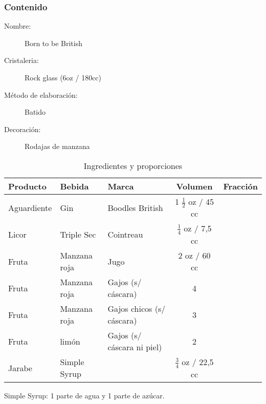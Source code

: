 \bigskip 
\bigskip 
\subsubsection{Contenido}
\bigskip 

\begin{description}
\item[Nombre:] Born to be British
\item[Cristaleria:] Rock glass (6oz / 180cc)
\item[M\'etodo de elaboraci\'on:] Batido
\item[Decoraci\'on:] Rodajas de manzana
\end{description}

\begin{table}[h]
\caption{Ingredientes y proporciones} 
\label{tab:fonts}
\begin{center}       
\begin{tabular}{|l|l|l|c|l|} %
\hline
\rule[-1ex]{0pt}{3.5ex}  \textbf{Producto} & \textbf{Bebida} & \textbf{Marca} & \textbf{Volumen} & \textbf{Fracci\'on}  \\
\hline
\rule[-1ex]{0pt}{3.5ex}  Aguardiente & Gin 			& Boodles British 		& 1  $\frac{1}{2}$ oz / 45 cc 	&  	\\
\hline
\rule[-1ex]{0pt}{3.5ex}  Licor 		& Triple Sec 	& Cointreau 				& $\frac{1}{4}$ oz / 7,5 cc 		&  	\\
\hline
\rule[-1ex]{0pt}{3.5ex}  Fruta 		& Manzana roja 	& Jugo	 				& 2 oz / 60 cc					& 	\\
\hline
\rule[-1ex]{0pt}{3.5ex}  Fruta 		& Manzana roja 	& Gajos (s/ c\'ascara)	& 4								& 	\\
\hline
\rule[-1ex]{0pt}{3.5ex}  Fruta 		& Manzana roja 	& Gajos chicos (s/ c\'ascara)	& 3								& 	\\
\hline
\rule[-1ex]{0pt}{3.5ex}  Fruta 		& lim\'on	 	& Gajos (s/ c\'ascara ni piel)	& 2								& 	\\
\hline
\rule[-1ex]{0pt}{3.5ex}  Jarabe		& Simple Syrup 	& 						& $\frac{3}{4}$ oz / 22,5 cc 		&  	\\
\hline
\end{tabular}
\end{center}
\end{table} 
Simple Syrup: 1 parte de agua y 1 parte de az\'ucar.
\bigskip 

